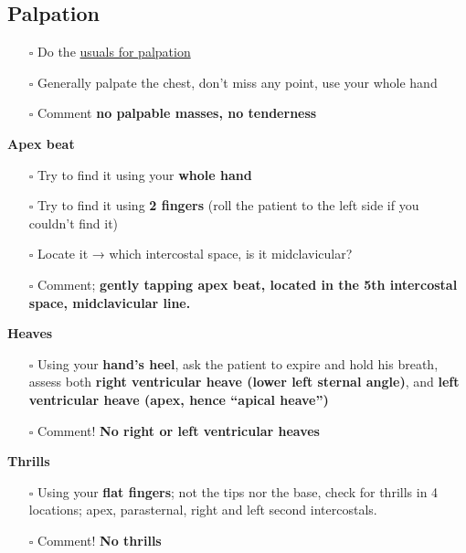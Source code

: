 \documentclass[
  13.5pt,
  a4paper,
  DIV=11,
  numbers=noendperiod]{scrreprt}
\providecommand{\tightlist}{%
  \setlength{\itemsep}{0pt}\setlength{\parskip}{0pt}}
\begin{document}
\subsection{Palpation}\label{palpation-1}

\begin{itemize}
\tightlist
\item[$\square$]
  Do the \href{miscellaneous.qmd}{usuals for palpation}
\item[$\square$]
  Generally palpate the chest, don't miss any point, use your whole hand
\item[$\square$]
  Comment \textbf{no palpable masses, no tenderness}
\end{itemize}

\textbf{Apex beat}

\begin{itemize}
\tightlist
\item[$\square$]
  Try to find it using your \textbf{whole hand}
\item[$\square$]
  Try to find it using \textbf{2 fingers} (roll the patient to the left
  side if you couldn't find it)
\item[$\square$]
  Locate it → which intercostal space, is it midclavicular?
\item[$\square$]
  Comment; \textbf{gently tapping apex beat, located in the 5th
  intercostal space, midclavicular line.}
\end{itemize}

\textbf{Heaves}

\begin{itemize}
\tightlist
\item[$\square$]
  Using your \textbf{hand's heel}, ask the patient to expire and hold
  his breath, assess both \textbf{right ventricular heave (lower left
  sternal angle)}, and \textbf{left ventricular heave (apex, hence
  ``apical heave'')}
\item[$\square$]
  Comment! \textbf{No right or left ventricular heaves}
\end{itemize}

\textbf{Thrills}

\begin{itemize}
\tightlist
\item[$\square$]
  Using your \textbf{flat fingers}; not the tips nor the base, check for
  thrills in 4 locations; apex, parasternal, right and left second
  intercostals.
\item[$\square$]
  Comment! \textbf{No thrills}
\end{itemize}
\end{document}

